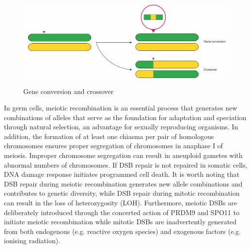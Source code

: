 \begin{figure}[h]
\caption{Gene conversion and crossover}
\label{figure:homologous-recombination}
\centering
\includegraphics[width=1\textwidth]{chapter4_fig4.jpg} \\ \smallskip
{}
\end{figure}

In germ cells, meiotic recombination is an essential process that generates new combinations of alleles that serve as the foundation for adaptation and speciation through natural selection, an advantage for sexually reproducing organisms. In addition, the formation of at least one chiasma per pair of homologous chromosomes ensures proper segregation of chromosomes in anaphase I of meiosis. Improper chromosome segregation can result in aneuploid gametes with abnormal numbers of chromosomes. If DSB repair is not repaired in somatic cells, DNA damage response initiates programmed cell death. It is worth noting that DSB repair during meiotic recombination generates new allele combinations and contributes to genetic diversity, while DSB repair during mitotic recombination can result in the loss of heterozygosity (LOH). Furthermore, meiotic DSBs are deliberately introduced through the concerted action of PRDM9 and SPO11 to initiate meiotic recombination while mitotic DSBs are inadvertently generated from both endogenous (e.g. reactive oxygen species) and exogenous factors (e.g. ionising radiation).


